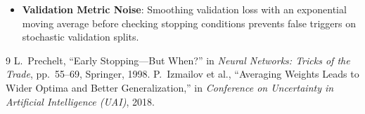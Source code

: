 \documentclass[11pt,a4paper]{article}
\theoremstyle{definition}
\begin{document}
\begin{itemize}
    \item \textbf{Validation Metric Noise}: Smoothing validation loss with an exponential moving average before checking stopping conditions prevents false triggers on stochastic validation splits.
\end{itemize}

\begin{thebibliography}{9}
 L.~Prechelt, ``Early Stopping---But When?'' in \emph{Neural Networks: Tricks of the Trade}, pp.~55--69, Springer, 1998.
 P.~Izmailov et al., ``Averaging Weights Leads to Wider Optima and Better Generalization,'' in \emph{Conference on Uncertainty in Artificial Intelligence (UAI)}, 2018.
\end{thebibliography}
\end{document}
